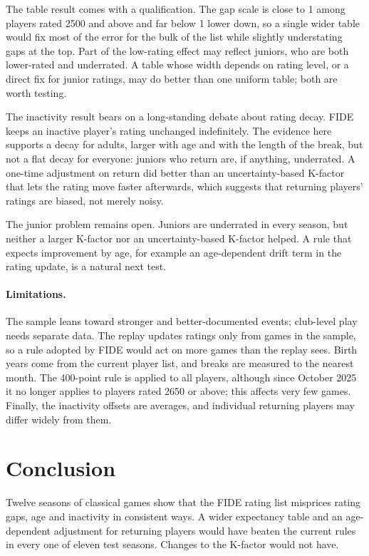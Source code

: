 \documentclass[11pt]{article}
\begin{document}
The table result comes with a qualification. The gap scale is close to 1 among players rated 2500 and above and far below 1 lower down, so a single wider table would fix most of the error for the bulk of the list while slightly understating gaps at the top. Part of the low-rating effect may reflect juniors, who are both lower-rated and underrated. A table whose width depends on rating level, or a direct fix for junior ratings, may do better than one uniform table; both are worth testing.

The inactivity result bears on a long-standing debate about rating decay. FIDE keeps an inactive player's rating unchanged indefinitely. The evidence here supports a decay for adults, larger with age and with the length of the break, but not a flat decay for everyone: juniors who return are, if anything, underrated. A one-time adjustment on return did better than an uncertainty-based K-factor that lets the rating move faster afterwards, which suggests that returning players' ratings are biased, not merely noisy.

The junior problem remains open. Juniors are underrated in every season, but neither a larger K-factor nor an uncertainty-based K-factor helped. A rule that expects improvement by age, for example an age-dependent drift term in the rating update, is a natural next test.

\paragraph{Limitations.} The sample leans toward stronger and better-documented events; club-level play needs separate data. The replay updates ratings only from games in the sample, so a rule adopted by FIDE would act on more games than the replay sees. Birth years come from the current player list, and breaks are measured to the nearest month. The 400-point rule is applied to all players, although since October 2025 it no longer applies to players rated 2650 or above; this affects very few games. Finally, the inactivity offsets are averages, and individual returning players may differ widely from them.

\section{Conclusion}

Twelve seasons of classical games show that the FIDE rating list misprices rating gaps, age and inactivity in consistent ways. A wider expectancy table and an age-dependent adjustment for returning players would have beaten the current rules in every one of eleven test seasons. Changes to the K-factor would not have.
\end{document}
